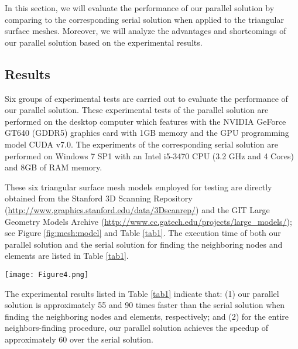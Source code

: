 \documentclass[twocolumn]{svjour3}          \smartqed  \usepackage{graphicx}
\begin{document}
In this section, we will evaluate the performance of our parallel solution 
by comparing to the corresponding serial solution when applied to the 
triangular surface meshes. Moreover, we will analyze the advantages and 
shortcomings of our parallel solution based on the experimental results. 

\subsection{Results}

Six groups of experimental tests are carried out to evaluate the performance 
of our parallel solution. These experimental tests of the parallel solution 
are performed on the desktop computer which features with the NVIDIA GeForce 
GT640 (GDDR5) graphics card with 1GB memory and the GPU programming model 
CUDA v7.0. The experiments of the corresponding serial solution are 
performed on Windows 7 SP1 with an Intel i5-3470 CPU (3.2 GHz and 4 Cores) 
and 8GB of RAM memory. 

These six triangular surface mesh models employed for testing are directly 
obtained from the Stanford 3D Scanning Repository (\url{http://www.graphics.stanford.edu/data/3Dscanrep/}) 
and the GIT Large Geometry Models Archive (\url{http://www.cc.gatech.edu/projects/large_models/}); 
see Figure \ref{fig:mesh:model} and Table 
\ref{tab1}. The execution time of both our parallel solution and the serial solution 
for finding the neighboring nodes and elements are listed in Table \ref{tab1}.

\begin{figure*}[htbp]
	\centering
    \texttt{[image: Figure4.png]}
	\caption{Six mesh models that are employed for experimental tests}
	\label{fig:mesh:model}       \end{figure*}

The experimental results listed in Table \ref{tab1} indicate that: (1) our parallel 
solution is approximately 55 and 90 times faster than the  
serial solution when finding the neighboring nodes and elements, 
respectively; and (2) for the entire neighbors-finding procedure, our 
parallel solution achieves the speedup of approximately 60 over the serial 
solution.
\end{document}
